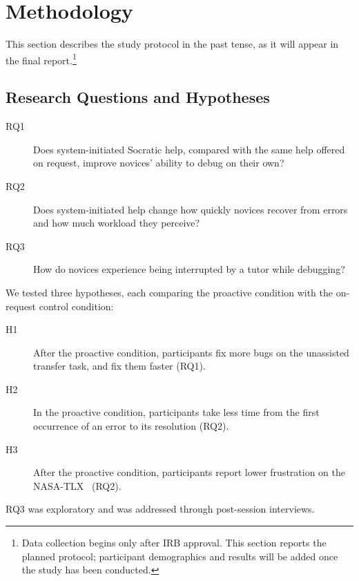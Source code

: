 \documentclass[manuscript,review]{acmart}
\begin{document}
\section{Methodology}
\label{sec:method}
This section describes the study protocol in the past tense, as it will appear in the final report.\footnote{Data collection begins only after IRB approval. This section reports the planned protocol; participant demographics and results will be added once the study has been conducted.}

\subsection{Research Questions and Hypotheses}
\begin{description}
  \item[RQ1] Does system-initiated Socratic help, compared with the same help offered on request, improve novices' ability to debug on their own?
  \item[RQ2] Does system-initiated help change how quickly novices recover from errors and how much workload they perceive?
  \item[RQ3] How do novices experience being interrupted by a tutor while debugging?
\end{description}
We tested three hypotheses, each comparing the proactive condition with the on-request control condition:
\begin{description}
  \item[H1] After the proactive condition, participants fix more bugs on the unassisted transfer task, and fix them faster (RQ1).
  \item[H2] In the proactive condition, participants take less time from the first occurrence of an error to its resolution (RQ2).
  \item[H3] After the proactive condition, participants report lower frustration on the NASA-TLX~\cite{hart1988tlx} (RQ2).
\end{description}
RQ3 was exploratory and was addressed through post-session interviews.
\end{document}
